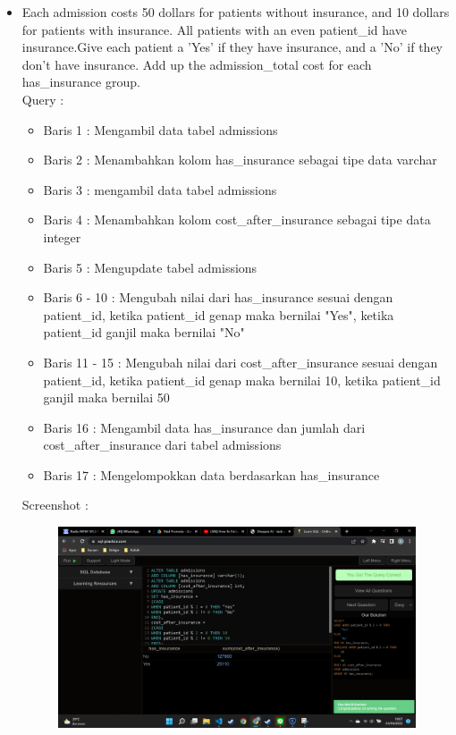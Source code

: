 \documentclass[]{article}
\begin{document}
\begin{itemize}
        \item Each admission costs 50 dollars for patients without insurance, and 10 dollars for patients with insurance. All patients with an even patient\_id have insurance.Give each patient a 'Yes' if they have insurance, and a 'No' if they don't have insurance. Add up the admission\_total cost for each has\_insurance group.
        \\Query :
        
        \begin{itemize}
            \item Baris 1 : Mengambil data tabel admissions
            \item Baris 2 : Menambahkan kolom has\_insurance sebagai tipe data varchar
            \item Baris 3 : mengambil data tabel admissions
            \item Baris 4 : Menambahkan kolom cost\_after\_insurance sebagai tipe data integer
            \item Baris 5 : Mengupdate tabel admissions
            \item Baris 6 - 10 : Mengubah nilai dari has\_insurance sesuai dengan patient\_id, ketika patient\_id genap maka bernilai "Yes", ketika patient\_id ganjil maka bernilai "No"
            \item Baris 11 - 15 : Mengubah nilai dari cost\_after\_insurance sesuai dengan patient\_id, ketika patient\_id genap maka bernilai 10, ketika patient\_id ganjil maka bernilai 50
            \item Baris 16 : Mengambil data has\_insurance dan jumlah dari \\cost\_after\_insurance dari tabel admissions
            \item Baris 17 : Mengelompokkan data berdasarkan has\_insurance
        \end{itemize}
        Screenshot :
        \begin{figure}[h]
            \includegraphics[scale=0.3]{./Screenshot/Hard-5.png}
            \centering
        \end{figure}


\end{itemize}
\end{document}
